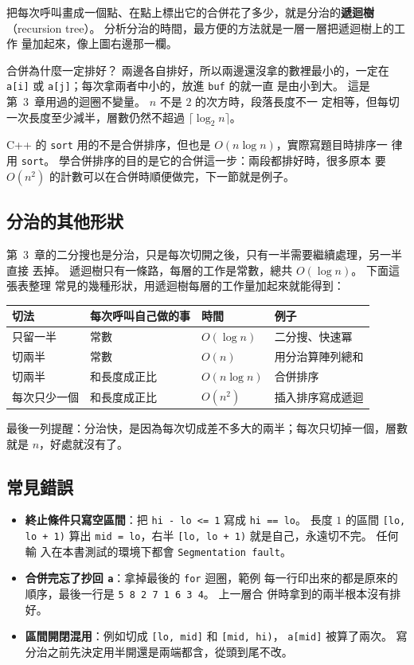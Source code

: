把每次呼叫畫成一個點、在點上標出它的合併花了多少，就是分治的\textbf{遞迴樹}
（recursion tree）。 分析分治的時間，最方便的方法就是一層一層把遞迴樹上的工作
量加起來，像上圖右邊那一欄。

合併為什麼一定排好？ 兩邊各自排好，所以兩邊還沒拿的數裡最小的，一定在
\texttt{a[i]} 或 \texttt{a[j]}；每次拿兩者中小的，放進 \texttt{buf} 的就一直
是由小到大。 這是第~3~章用過的迴圈不變量。 $n$ 不是 $2$ 的次方時，段落長度不一
定相等，但每切一次長度至少減半，層數仍然不超過 $\lceil \log_2 n \rceil$。

C++ 的 \texttt{sort} 用的不是合併排序，但也是 $O(n \log n)$，實際寫題目時排序一
律用 \texttt{sort}。 學合併排序的目的是它的合併這一步：兩段都排好時，很多原本
要 $O(n^2)$ 的計數可以在合併時順便做完，下一節就是例子。

\subsection{分治的其他形狀}

第~3~章的二分搜也是分治，只是每次切開之後，只有一半需要繼續處理，另一半直接
丟掉。 遞迴樹只有一條路，每層的工作是常數，總共 $O(\log n)$。 下面這張表整理
常見的幾種形狀，用遞迴樹每層的工作量加起來就能得到：

\begin{center}
\begin{tabular}{llll}
\toprule
切法 & 每次呼叫自己做的事 & 時間 & 例子 \\
\midrule
只留一半 & 常數 & $O(\log n)$ & 二分搜、快速冪 \\
切兩半 & 常數 & $O(n)$ & 用分治算陣列總和 \\
切兩半 & 和長度成正比 & $O(n \log n)$ & 合併排序 \\
每次只少一個 & 和長度成正比 & $O(n^2)$ & 插入排序寫成遞迴 \\
\bottomrule
\end{tabular}
\end{center}

最後一列提醒：分治快，是因為每次切成差不多大的兩半；每次只切掉一個，層數就是
$n$，好處就沒有了。

\subsection{常見錯誤}

\begin{itemize}
\item \textbf{終止條件只寫空區間}：把 \texttt{hi - lo <= 1} 寫成
\texttt{hi == lo}。 長度 $1$ 的區間 \texttt{[lo, lo + 1)} 算出
\texttt{mid = lo}，右半 \texttt{[lo, lo + 1)} 就是自己，永遠切不完。 任何輸
入在本書測試的環境下都會 \texttt{Segmentation fault}。
\item \textbf{合併完忘了抄回 \texttt{a}}：拿掉最後的 \texttt{for} 迴圈，範例
每一行印出來的都是原來的順序，最後一行是 \texttt{5 8 2 7 1 6 3 4}。 上一層合
併時拿到的兩半根本沒有排好。
\item \textbf{區間開閉混用}：例如切成 \texttt{[lo, mid]} 和 \texttt{[mid, hi)}，
\texttt{a[mid]} 被算了兩次。 寫分治之前先決定用半開還是兩端都含，從頭到尾不改。
\end{itemize}

